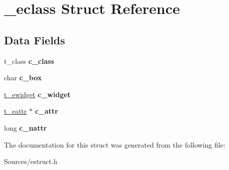 \hypertarget{struct__eclass}{\section{\-\_\-eclass Struct Reference}
\label{struct__eclass}
}
\subsection*{Data Fields}
\begin{DoxyCompactItemize}
\item 
\hypertarget{struct__eclass_a0469b08ed4568634e94e1ef9844987dc}{t\-\_\-class {\bfseries c\-\_\-class}}\label{struct__eclass_a0469b08ed4568634e94e1ef9844987dc}

\item 
\hypertarget{struct__eclass_a86d57fd0700572f515dcadd123b81748}{char {\bfseries c\-\_\-box}}\label{struct__eclass_a86d57fd0700572f515dcadd123b81748}

\item 
\hypertarget{struct__eclass_ae7433b03225f5ef8d13d025e6545952c}{\hyperlink{struct__ewidget}{t\-\_\-ewidget} {\bfseries c\-\_\-widget}}\label{struct__eclass_ae7433b03225f5ef8d13d025e6545952c}

\item 
\hypertarget{struct__eclass_a5770c150b221e33c7502b23d066675fa}{\hyperlink{struct__eattr}{t\-\_\-eattr} $\ast$ {\bfseries c\-\_\-attr}}\label{struct__eclass_a5770c150b221e33c7502b23d066675fa}

\item 
\hypertarget{struct__eclass_a2214009a25c6ee1b8b41008f15995c85}{long {\bfseries c\-\_\-nattr}}\label{struct__eclass_a2214009a25c6ee1b8b41008f15995c85}

\end{DoxyCompactItemize}


The documentation for this struct was generated from the following file\-:\begin{DoxyCompactItemize}
\item 
Sources/estruct.\-h\end{DoxyCompactItemize}

